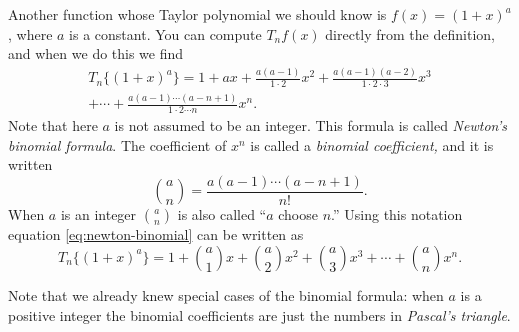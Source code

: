Another function whose Taylor polynomial we should know is $f(x)=(1+x)^a$,
where $a$ is a constant.  You can compute $T_nf(x)$ directly from the
definition, and when we do this we find
\begin{multline}
  \label{eq:newton-binomial}
  T_n\{(1+x)^a\} = 1 + ax +\frac{a(a-1)}{1\cdot2} x^2
  +\frac{a(a-1)(a-2)}{1\cdot2\cdot3} x^3\\
  +\cdots+\frac{a(a-1)\cdots (a-n+1)}{1\cdot2\cdots n} x^n.
\end{multline}
Note that here $a$ is not assumed to be an integer.
This formula is called \emph{Newton's binomial formula}.  The coefficient
of $x^n$ is called a \emph{binomial coefficient,} and it is written
\begin{equation}
  \label{eq:binom-coeff}
  \binom an = \frac{a(a-1)\cdots (a-n+1)}{n!}.
\end{equation}
When $a$ is an integer $\binom an$ is also called ``$a$ choose $n$.''
Using this notation equation \eqref{eq:newton-binomial} can be written as
\[
  T_n \bigl\{(1+x)^a\bigr\} 
  = 1 + \binom a1 x+ \binom a2 x^2 + \binom a3 x^3 + \cdots + \binom an x^n.
\]

Note that we already knew special cases of the binomial formula: when $a$
is a positive integer the binomial coefficients are just the numbers in
\emph{Pascal's triangle}.  

